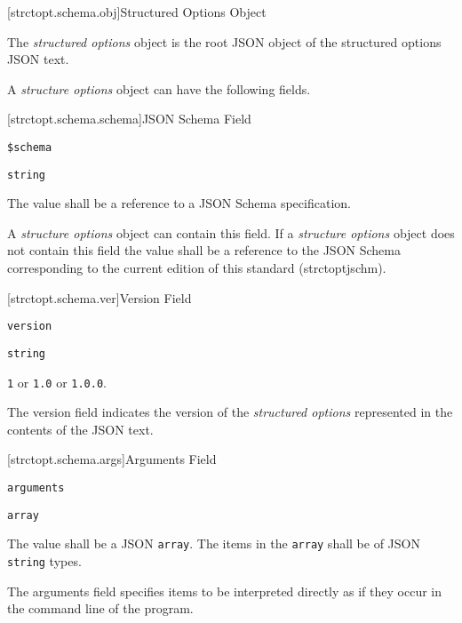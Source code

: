 [strctopt.schema.obj]{Structured Options Object}

\pnum
The \emph{structured options} object is the root JSON object of the structured
options JSON text.

\pnum
A \emph{structure options} object can have the following fields.

[strctopt.schema.schema]{JSON Schema Field}

\begin{itemdescr}

	\pnum \fldname \verb|$schema|

	\pnum \fldtype \verb|string|

	\pnum \fldval
	The value shall be a reference to a JSON Schema specification.

	\pnum \flddesc
	A \emph{structure options} object can contain this field. If a
	\emph{structure options} object does not contain this field the value shall
	be a reference to the JSON Schema corresponding to the current edition of
	this standard (strctoptjschm).

\end{itemdescr}

[strctopt.schema.ver]{Version Field}

\begin{itemdescr}

	\pnum \fldname \verb|version|

	\pnum \fldtype \verb|string|

	\pnum \fldval
	\verb|1| or \verb|1.0| or \verb|1.0.0|.

	\pnum
	\flddesc
	The version field indicates the version of the \emph{structured options}
	represented in the contents of the JSON text.

\end{itemdescr}

[strctopt.schema.args]{Arguments Field}

\begin{itemdescr}

	\pnum \fldname \verb|arguments|

	\pnum \fldtype \verb|array|

	\pnum \fldval
	The value shall be a JSON \verb|array|. The items in the \verb|array| shall
	be of JSON \verb|string| types.

	\pnum \flddesc
	The arguments field specifies items to be interpreted directly as if they
	occur in the command line of the program.

\end{itemdescr}

